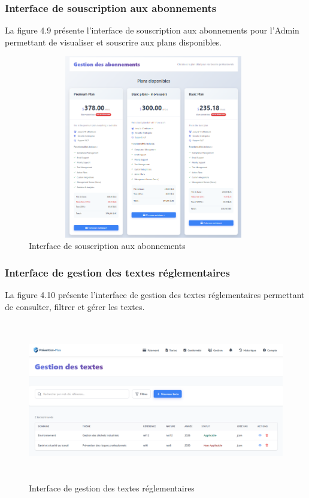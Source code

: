 \subsubsection{Interface de souscription aux abonnements}
\noindent La figure 4.9 présente l'interface de souscription aux abonnements pour l'Admin permettant de visualiser et souscrire aux plans disponibles.

\begin{figure}[H]
    \centering
    \includegraphics[width=11cm,height=8cm]{images/subscriptioninterface.PNG}
    \caption{Interface de souscription aux abonnements}
\end{figure}

\subsubsection{Interface de gestion des textes réglementaires}
\noindent La figure 4.10 présente l'interface de gestion des textes réglementaires permettant de consulter, filtrer et gérer les textes.

\begin{figure}[H]
    \centering
    \includegraphics[width=12cm,height=7cm]{images/textsinterface.PNG}
    \caption{Interface de gestion des textes réglementaires}
\end{figure}

